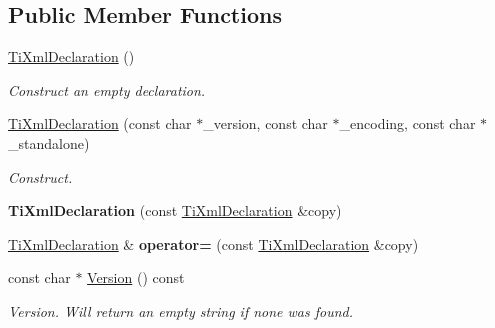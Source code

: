 \subsection*{Public Member Functions}
\begin{DoxyCompactItemize}
\item 
\mbox{\label{classTiXmlDeclaration_aa0484d059bea0ea1acb47c9094382d79}} 
\hyperlink{classTiXmlDeclaration_aa0484d059bea0ea1acb47c9094382d79}{Ti\+Xml\+Declaration} ()
\begin{DoxyCompactList}\small\item\em Construct an empty declaration. \end{DoxyCompactList}\item 
\mbox{\label{classTiXmlDeclaration_a3b618d1c30c25e4b7a71f31a595ee298}} 
\hyperlink{classTiXmlDeclaration_a3b618d1c30c25e4b7a71f31a595ee298}{Ti\+Xml\+Declaration} (const char $\ast$\+\_\+version, const char $\ast$\+\_\+encoding, const char $\ast$\+\_\+standalone)
\begin{DoxyCompactList}\small\item\em Construct. \end{DoxyCompactList}\item 
\mbox{\label{classTiXmlDeclaration_a58ac9042c342f7845c8491da0bb091e8}} 
{\bfseries Ti\+Xml\+Declaration} (const \hyperlink{classTiXmlDeclaration}{Ti\+Xml\+Declaration} \&copy)
\item 
\mbox{\label{classTiXmlDeclaration_a3bc617efe11014ff2b1a9c5727c37a9a}} 
\hyperlink{classTiXmlDeclaration}{Ti\+Xml\+Declaration} \& {\bfseries operator=} (const \hyperlink{classTiXmlDeclaration}{Ti\+Xml\+Declaration} \&copy)
\item 
\mbox{\label{classTiXmlDeclaration_a95cdcb9354ea220065bd378ffcacc7bd}} 
const char $\ast$ \hyperlink{classTiXmlDeclaration_a95cdcb9354ea220065bd378ffcacc7bd}{Version} () const
\begin{DoxyCompactList}\small\item\em Version. Will return an empty string if none was found. \end{DoxyCompactList}\item 
\mbox{\label{classTiXmlDeclaration_a8d3d1b5b226daa8353276d719497be80}} 

\end{DoxyCompactItemize}
